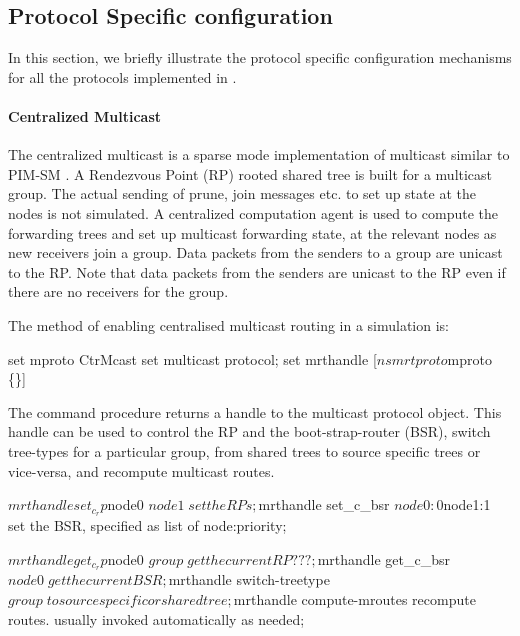\subsection{Protocol Specific configuration}

In this section, we briefly illustrate the
protocol specific configuration mechanisms
for all the protocols implemented in \ns.

\paragraph{Centralized Multicast}
The centralized multicast is a sparse mode implementation of multicast
similar to PIM-SM \cite{Deer94a:Architecture}.
A Rendezvous Point (RP) rooted shared tree is built
for a multicast group.  The actual sending of prune, join messages
etc. to set up state at the nodes is not simulated.  A centralized
computation agent is used to compute the forwarding trees and set up
multicast forwarding state,  at the relevant nodes as new
receivers join a group.  Data packets from the senders to a group are
unicast to the RP.  Note that data packets from the senders are
unicast to the RP even if there are no receivers for the group.

The method of enabling centralised multicast routing in a simulation is:
\begin{program}
        set mproto CtrMcast    \; set multicast protocol;
        set mrthandle [$ns mrtproto $mproto \{\}]
\end{program}
The command procedure 
returns a handle to the multicast protocol object.
This handle can be used to control the RP and the boot-strap-router (BSR),
switch tree-types for a particular group,
from shared trees to source specific trees or vice-versa, and
recompute multicast routes.
\begin{program}
        $mrthandle set_c_rp $node0 $node1          \; set the RPs;
        $mrthandle set_c_bsr $node0:0 $node1:1     \; set the BSR, specified as list of node:priority;

        $mrthandle get_c_rp $node0 $group          \; get the current RP ???;
        $mrthandle get_c_bsr $node0                \; get the current BSR;

        $mrthandle switch-treetype $group         \; to source specific or shared tree;

        $mrthandle compute-mroutes       \; recompute routes. usually invoked automatically as needed;
\end{program}

